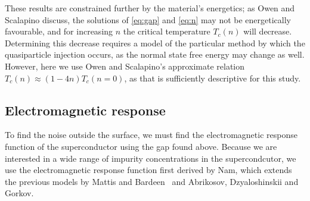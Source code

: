 \documentclass{article}
\begin{document}
These results are constrained further by the material's energetics;
as Owen and Scalapino discuss, the solutions of \eqref{eq:gap} and \eqref{eq:n} may not be energetically favourable, and for increasing $n$ the critical temperature $T_c(n)$ will decrease.\cite{OwenScalapino}
Determining this decrease requires a model of the particular method by which the quasiparticle injection occurs, as the normal state free energy may change as well.
However, here we use Owen and Scalapino's approximate relation $T_c(n) \approx (1 - 4n) T_c(n = 0)$, as that is sufficiently descriptive for this study.

\subsection{Electromagnetic response}

To find the noise outside the surface, we must find the electromagnetic response function of the superconductor using the gap found above.
Because we are interested in a wide range of impurity concentrations in the supercondcutor, we use the electromagnetic response function first derived by Nam\cite{Nam1967}, which extends the previous models by Mattis and Bardeen~\cite{Mattis} and Abrikosov, Dzyaloshinskii and Gorkov\cite{AGD}.
\end{document}
